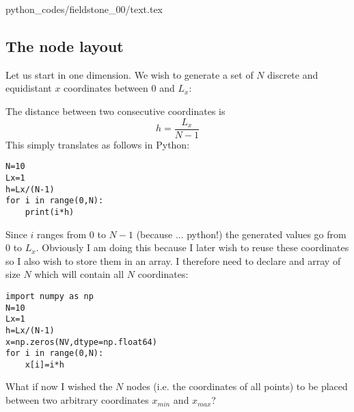 \begin{flushright} {\tiny {\color{gray} python\_codes/fieldstone\_00/text.tex}} \end{flushright}


\subsection*{The node layout}

Let us start in one dimension. We wish to generate a 
set of $N$ discrete and equidistant $x$ coordinates 
between $0$ and $L_x$:

\begin{center}
\end{center}

\noindent
The distance between two consecutive coordinates is 
\[
h = \frac{L_x}{N-1}
\]
This simply translates as follows in Python:
\begin{lstlisting}
N=10
Lx=1
h=Lx/(N-1)
for i in range(0,N):
    print(i*h)
\end{lstlisting}

Since $i$ ranges from 0 to $N-1$ (because ... python!) the generated values go from 0 to $L_x$. 
Obviously I am doing this because I later wish to reuse these coordinates 
so I also wish to store them in an array.
I therefore need to declare and array of size $N$ which will 
contain all $N$ coordinates:
\begin{lstlisting}
import numpy as np
N=10
Lx=1
h=Lx/(N-1)
x=np.zeros(NV,dtype=np.float64)
for i in range(0,N):
    x[i]=i*h
\end{lstlisting}

What if now I wished the $N$ nodes (i.e. the coordinates of all points) to be placed between two arbitrary coordinates $x_{min}$ and $x_{max}$?

